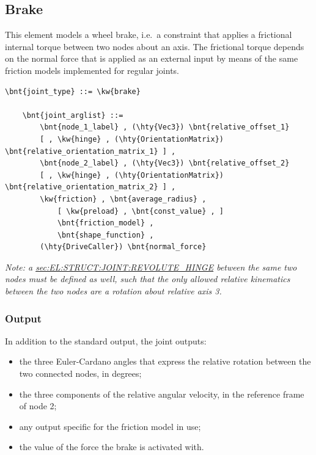 \subsection{Brake}
This element models a wheel brake, i.e.\ a constraint that applies
a frictional internal torque between two nodes about an axis.
The frictional torque depends on the normal force that is applied 
as an external input by means of the same friction models implemented
for regular joints.
\begin{Verbatim}[commandchars=\\\{\}]
    \bnt{joint_type} ::= \kw{brake}

    \bnt{joint_arglist} ::= 
        \bnt{node_1_label} , (\hty{Vec3}) \bnt{relative_offset_1} 
        [ , \kw{hinge} , (\hty{OrientationMatrix}) \bnt{relative_orientation_matrix_1} ] ,
        \bnt{node_2_label} , (\hty{Vec3}) \bnt{relative_offset_2}
        [ , \kw{hinge} , (\hty{OrientationMatrix}) \bnt{relative_orientation_matrix_2} ] ,
        \kw{friction} , \bnt{average_radius} , 
            [ \kw{preload} , \bnt{const_value} , ]
            \bnt{friction_model} , 
            \bnt{shape_function} ,
        (\hty{DriveCaller}) \bnt{normal_force}
\end{Verbatim}
\emph{Note: a
\hyperref{\kw{revolute hinge}}{\kw{revolute hinge} (see Section~}{)}{sec:EL:STRUCT:JOINT:REVOLUTE_HINGE}
between the same two nodes must be defined as well, such that
the only allowed relative kinematics between the two nodes are
a rotation about relative axis 3.
}

\subsubsection{Output}
In addition to the standard output, the  joint outputs:
\begin{itemize}
\item the three Euler-Cardano angles that express the relative rotation
	between the two connected nodes, in degrees;
\item the three components of the relative angular velocity,
	in the reference frame of node 2;
\item any output specific for the friction model in use;
\item the value of the force the brake is activated with.
\end{itemize}

